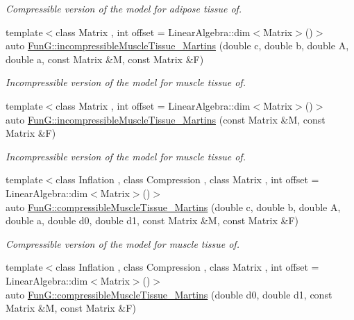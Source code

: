\begin{DoxyCompactItemize}
\begin{DoxyCompactList}\small\item\em \-Compressible version of the model for adipose tissue of. \end{DoxyCompactList}\item 
{\footnotesize template$<$class Matrix , int offset = \-Linear\-Algebra\-::dim$<$\-Matrix$>$()$>$ }\\auto \hyperlink{group__Biomechanics_gafcc36a1958899ca9246c4c1b3c9bfd85}{\-Fun\-G\-::incompressible\-Muscle\-Tissue\-\_\-\-Martins} (double c, double b, double \-A, double a, const \-Matrix \&\-M, const \-Matrix \&\-F)
\begin{DoxyCompactList}\small\item\em \-Incompressible version of the model for muscle tissue of. \end{DoxyCompactList}\item 
{\footnotesize template$<$class Matrix , int offset = \-Linear\-Algebra\-::dim$<$\-Matrix$>$()$>$ }\\auto \hyperlink{group__Biomechanics_ga9e414585a90b1988e9fa88d17d875055}{\-Fun\-G\-::incompressible\-Muscle\-Tissue\-\_\-\-Martins} (const \-Matrix \&\-M, const \-Matrix \&\-F)
\begin{DoxyCompactList}\small\item\em \-Incompressible version of the model for muscle tissue of. \end{DoxyCompactList}\item 
{\footnotesize template$<$class Inflation , class Compression , class Matrix , int offset = \-Linear\-Algebra\-::dim$<$\-Matrix$>$()$>$ }\\auto \hyperlink{group__Biomechanics_gad831914c493a3da04ed40c3c0ce87a62}{\-Fun\-G\-::compressible\-Muscle\-Tissue\-\_\-\-Martins} (double c, double b, double \-A, double a, double d0, double d1, const \-Matrix \&\-M, const \-Matrix \&\-F)
\begin{DoxyCompactList}\small\item\em \-Compressible version of the model for muscle tissue of. \end{DoxyCompactList}\item 
{\footnotesize template$<$class Inflation , class Compression , class Matrix , int offset = \-Linear\-Algebra\-::dim$<$\-Matrix$>$()$>$ }\\auto \hyperlink{group__Biomechanics_ga46a70ccb2285e12addad87b6a8aaaae8}{\-Fun\-G\-::compressible\-Muscle\-Tissue\-\_\-\-Martins} (double d0, double d1, const \-Matrix \&\-M, const \-Matrix \&\-F)

\end{DoxyCompactItemize}
